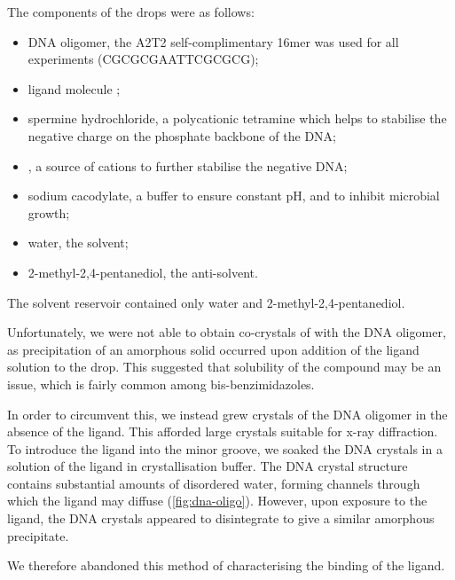\begin{refsection}
The components of the drops were as follows:

\begin{itemize}
    \item DNA oligomer, the A2T2 self-complimentary 16mer was used for all experiments (CGCGCGAATTCGCGCG);
    \item ligand molecule ;
    \item spermine hydrochloride, a polycationic tetramine which helps to stabilise the negative charge on the phosphate backbone of the DNA;\@
    \item {}, a source of  cations to further stabilise the negative DNA;\@
    \item sodium cacodylate, a buffer to ensure constant pH, and to inhibit microbial growth;
    \item water, the solvent;
    \item 2-methyl-2,4-pentanediol, the anti-solvent.
\end{itemize}

The solvent reservoir contained only water and 2-methyl-2,4-pentanediol.

Unfortunately, we were not able to obtain co-crystals of  with the DNA oligomer, as precipitation of an amorphous solid occurred upon addition of the ligand solution to the drop.
This suggested that solubility of the compound may be an issue, which is fairly common among bis-benzimidazoles.

In order to circumvent this, we instead grew crystals of the DNA oligomer in the absence of the ligand.
This afforded large crystals suitable for x-ray diffraction.
To introduce the ligand into the minor groove, we soaked the DNA crystals in a solution of the ligand in crystallisation buffer.
The DNA crystal structure contains substantial amounts of disordered water, forming channels through which the ligand may diffuse (\cref{fig:dna-oligo}).
However, upon exposure to the ligand, the DNA crystals appeared to disintegrate to give a similar amorphous precipitate.

We therefore abandoned this method of characterising the binding of the ligand.


\end{refsection}
